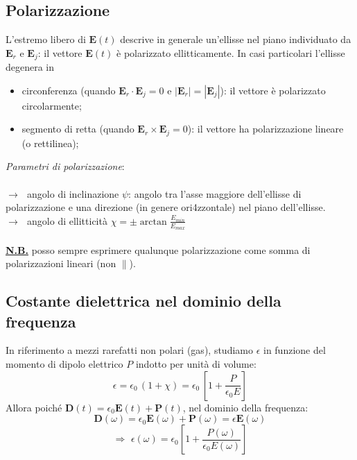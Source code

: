 \documentclass[a4paper]{article}
\begin{document}
\subsection*{Polarizzazione}
L'estremo libero di $\textbf{E}(t)$ descrive in generale un'ellisse nel piano individuato da $\textbf{E}_r$ e $\textbf{E}_j$: il vettore $\textbf{E}(t)$ è polarizzato ellitticamente. In casi particolari l'ellisse degenera in
\begin{itemize}
\item circonferenza (quando $\textbf{E}_r\cdot\textbf{E}_j=0$ e $|\textbf{E}_r|=|\textbf{E}_j|$): il vettore è polarizzato circolarmente;
\item segmento di retta (quando $\textbf{E}_r\times\textbf{E}_j=0$): il vettore ha polarizzazione lineare (o rettilinea);
\end{itemize}
\emph{Parametri di polarizzazione}:\\\\
$\rightarrow\,\,$ angolo di inclinazione $\psi$: angolo tra l'asse maggiore dell'ellisse di polarizzazione e una direzione (in genere ori4zzontale) nel piano dell'ellisse.\\
$\rightarrow\,\,$ angolo di ellitticità $\chi=\pm\arctan\frac{E_{min}}{E_{max}}$\\\\
\underline{\textbf{N.B.}} posso sempre esprimere qualunque polarizzazione come somma di polarizzazioni lineari (non $\parallel$).
\subsection*{Costante dielettrica nel dominio della frequenza}
In riferimento a mezzi rarefatti non polari (gas), studiamo $\epsilon$ in funzione del momento di dipolo elettrico $P$ indotto per unità di volume:
\begin{equation*}
\epsilon=\epsilon_0\,(1+\chi)=\epsilon_0\,\left[1+\frac{P}{\epsilon_0E}\right]
\end{equation*}
Allora poiché $\textbf{D}(t)=\epsilon_0\textbf{E}(t)+\textbf{P}(t)$, nel dominio della frequenza:
\begin{equation*}
\textbf{D}(\omega)=\epsilon_0\textbf{E}(\omega)+\textbf{P}(\omega)=\epsilon\textbf{E}(\omega)
\end{equation*}
\begin{equation*}
\Rightarrow\,\,\epsilon(\omega)=\epsilon_0\left[1+\frac{P(\omega)}{\epsilon_0E(\omega)}\right]
\end{equation*}
\end{document}
